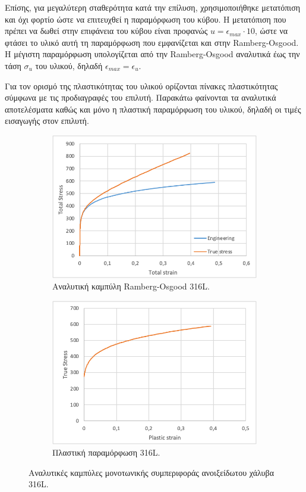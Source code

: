 \documentclass{article}
\begin{document}
Επίσης, για μεγαλύτερη σταθερότητα κατά την επίλυση, χρησιμοποιήθηκε μετατόπιση και όχι φορτίο ώστε να επιτευχθεί η παραμόρφωση του κύβου. Η μετατόπιση που πρέπει να δωθεί στην επιφάνεια του κύβου είναι προφανώς $u = \epsilon_{max} \cdot 10$, ώστε να φτάσει το υλικό αυτή τη παραμόρφωση που εμφανίζεται και στην Ramberg-Osgood. Η μέγιστη παραμόρφωση  υπολογίζεται από την Ramberg-Osgood αναλυτικά έως την τάση $\sigma_u$ του υλικού, δηλαδή $\epsilon_{max} = \epsilon_u$. 
\par Για τον ορισμό της πλαστικότητας του υλικού ορίζονται πίνακες πλαστικότητας σύμφωνα με τις προδιαγραφές του επιλυτή. Παρακάτω φαίνονται τα αναλυτικά αποτελέσματα καθώς και μόνο η πλαστική παραμόρφωση του υλικού, δηλαδή οι τιμές εισαγωγής στον επιλυτή.
\begin{figure}[H]
    \centering
    \begin{subfigure}{0.45\linewidth}
        \centering
        \includegraphics[width=\linewidth]{media/ragood.png}
        \caption{Αναλυτική καμπύλη Ramberg-Osgood 316L.}
    \end{subfigure}
    \hfill
    \begin{subfigure}{0.45\linewidth}
        \centering
        \includegraphics[width=\linewidth]{media/plabaqus.png}
        \caption{Πλαστική παραμόρφωση 316L.}
    \end{subfigure}
    \caption{Αναλυτικές καμπύλες μονοτωνικής συμπεριφοράς ανοιξείδωτου χάλυβα 316L.}
    \label{fig:anal}
\end{figure}
\end{document}
